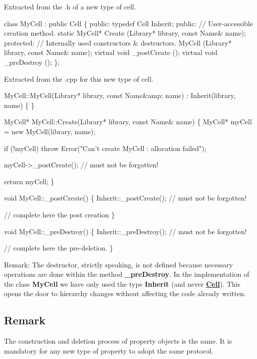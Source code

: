 Extracted from the .h of a new type of cell. 
\begin{DoxyCode}
\textcolor{keyword}{class }MyCell : \textcolor{keyword}{public} Cell \{
  \textcolor{keyword}{public}:  
    \textcolor{keyword}{typedef}  Cell  Inherit;
  \textcolor{keyword}{public}:
    \textcolor{comment}{// User-accessible creation method.}
    \textcolor{keyword}{static}  MyCell* Create      (Library* library, \textcolor{keyword}{const} Name& name);
  \textcolor{keyword}{protected}:
    \textcolor{comment}{// Internally used constructors & destructors. }
                    MyCell      (Library* library, \textcolor{keyword}{const} Name& name);
    \textcolor{keyword}{virtual} \textcolor{keywordtype}{void}    \_postCreate ();
    \textcolor{keyword}{virtual} \textcolor{keywordtype}{void}    \_preDestroy ();
\};
\end{DoxyCode}
 Extracted from the .cpp for this new type of cell. 
\begin{DoxyCode}
MyCell::MyCell(Library* library, \textcolor{keyword}{const} Name&amp; name)
  : Inherit(library, name)
\{ \}
 

MyCell* MyCell::Create(Library* library, \textcolor{keyword}{const} Name& name)
\{
  MyCell* myCell = \textcolor{keyword}{new} MyCell(library, name);
 
  \textcolor{keywordflow}{if} (!myCell) \textcolor{keywordflow}{throw} Error(\textcolor{stringliteral}{"Can't create MyCell : allocation failed"});
 
  myCell->\_postCreate(); \textcolor{comment}{// must not be forgotten!}
 
  \textcolor{keywordflow}{return} myCell;
\}
 

\textcolor{keywordtype}{void}  MyCell::\_postCreate()
\{
   Inherit::\_postCreate(); \textcolor{comment}{// must not be forgotten!}
 
   \textcolor{comment}{// complete here the post creation}
\}
 

\textcolor{keywordtype}{void}  MyCell::\_preDestroy()
\{
   Inherit::\_preDestroy(); \textcolor{comment}{// must not be forgotten!}
 
   \textcolor{comment}{// complete here the pre-deletion.}
\}
\end{DoxyCode}


\begin{DoxyParagraph}{Remark\+:}
The destructor, strictly speaking, is not defined because necessary operations are done within the method {\bfseries \+\_\+pre\+Destroy}. In the implementation of the class {\bfseries My\+Cell} we have only used the type {\bfseries Inherit} (and never {\bfseries \hyperlink{classHurricane_1_1Cell}{Cell}}). This opens the door to hierarchy changes without affecting the code already written.
\end{DoxyParagraph}
\hypertarget{classHurricane_1_1DBo_sDBoRemark}{}\subsection{Remark}\label{classHurricane_1_1DBo_sDBoRemark}
The construction and deletion process of property objects is the same. It is mandatory for any new type of property to adopt the same protocol. 

